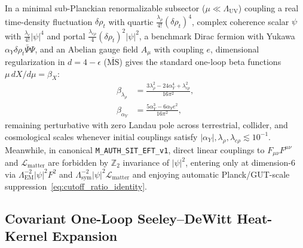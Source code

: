In a minimal sub-Planckian renormalizable subsector ($\mu \ll \Lambda_{\mathrm{UV}}$) coupling a real time-density fluctuation $\delta\rho_t$ with quartic $\frac{\lambda_\rho}{4!}(\delta\rho_t)^4$, complex coherence scalar $\psi$ with $\frac{\lambda_c}{4!}|\psi|^4$ and portal $\frac{\lambda_{c\rho}}{4}(\delta\rho_t)^2|\psi|^2$, a benchmark Dirac fermion with Yukawa $\alpha_Y\delta\rho_t\bar{\Psi}\Psi$, and an Abelian gauge field $A_\mu$ with coupling $e$, dimensional regularization in $d = 4 - \epsilon$ ($\overline{\mathrm{MS}}$) gives the standard one-loop beta functions $\mu\,dX/d\mu = \beta_X$:
\begin{align}
\beta_{\lambda_\rho} &= \frac{3\lambda_\rho^2 - 24\alpha_Y^4 + \lambda_{c\rho}^2}{16\pi^2}, \label{eq:beta_lambda_rho_sec22}\\
\beta_{\alpha_Y} &= \frac{5\alpha_Y^3 - 6\alpha_Y e^2}{16\pi^2}, \label{eq:beta_alpha_sec22}
\end{align}
remaining perturbative with zero Landau pole across terrestrial, collider, and cosmological scales whenever initial couplings satisfy $|\alpha_Y|, \lambda_\rho, \lambda_{c\rho} \lesssim 10^{-1}$. Meanwhile, in canonical \texttt{M\_AUTH\_SIT\_EFT\_v1}, direct linear couplings to $F_{\mu\nu}F^{\mu\nu}$ and $\mathcal{L}_{\mathrm{matter}}$ are forbidden by $\mathbb{Z}_2$ invariance of $|\psi|^2$, entering only at dimension-6 via $\Lambda_{\mathrm{EM}}^{-2}|\psi|^2 F^2$ and $\Lambda_{\mathrm{sym}}^{-2}|\psi|^2\mathcal{L}_{\mathrm{matter}}$ and enjoying automatic Planck/GUT-scale suppression~\eqref{eq:cutoff_ratio_identity}.

\subsection{Covariant One-Loop Seeley--DeWitt Heat-Kernel Expansion}

